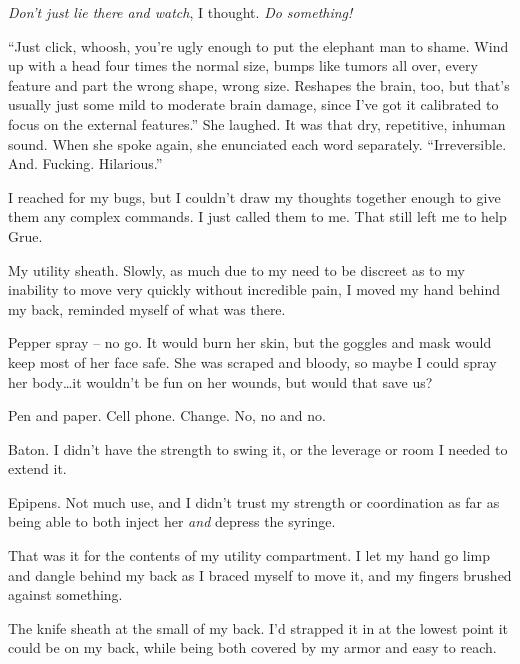 \emph{Don't just lie there and watch}, I thought.  \emph{Do something!}



``Just click, whoosh, you're ugly enough to put the elephant man to shame.  Wind up with a head four times the normal size, bumps like tumors all over, every feature and part the wrong shape, wrong size.  Reshapes the brain, too, but that's usually just some mild to moderate brain damage, since I've got it calibrated to focus on the external features.''  She laughed.  It was that dry, repetitive, inhuman sound.  When she spoke again, she enunciated each word separately.  ``Irreversible.  And.  Fucking.  Hilarious.''



I reached for my bugs, but I couldn't draw my thoughts together enough to give them any complex commands.  I just called them to me.  That still left me to help Grue.



My utility sheath.  Slowly, as much due to my need to be discreet as to my inability to move very quickly without incredible pain, I moved my hand behind my back, reminded myself of what was there.



Pepper spray – no go.  It would burn her skin, but the goggles and mask would keep most of her face safe.  She was scraped and bloody, so maybe I could spray her body\ldots it wouldn't be fun on her wounds, but would that save us?



Pen and paper.  Cell phone.  Change.  No, no and no.



Baton.  I didn't have the strength to swing it, or the leverage or room I needed to extend it.



Epipens.  Not much use, and I didn't trust my strength or coordination as far as being able to both inject her \emph{and} depress the syringe.



That was it for the contents of my utility compartment.  I let my hand go limp and dangle behind my back as I braced myself to move it, and my fingers brushed against something.



The knife sheath at the small of my back.  I'd strapped it in at the lowest point it could be on my back, while being both covered by my armor and easy to reach.



